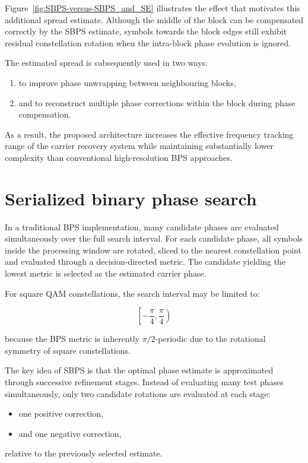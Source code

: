 Figure~\ref{fig:SBPS-versus-SBPS_and_SE} illustrates the effect that motivates this additional spread estimate. Although the middle of the block can be compensated correctly by the \ac{SBPS} estimate, symbols towards the block edges still exhibit residual constellation rotation when the intra-block phase evolution is ignored.

The estimated spread is subsequently used in two ways:
\begin{enumerate}
    \item to improve phase unwrapping between neighbouring blocks,
    \item and to reconstruct multiple phase corrections within the block during phase compensation.
\end{enumerate}

As a result, the proposed architecture increases the effective frequency tracking range of the carrier recovery system while maintaining substantially lower complexity than conventional high-resolution \ac{BPS} approaches.


\section{Serialized binary phase search}\label{sec:Serialized binary phase search}

In a traditional \ac{BPS} implementation, many candidate phases are evaluated simultaneously over the full search interval. For each candidate phase, all symbols inside the processing window are rotated, sliced to the nearest constellation point and evaluated through a decision-directed metric. The candidate yielding the lowest metric is selected as the estimated carrier phase.

For square \ac{QAM} constellations, the search interval may be limited to:

\[
\left[-\frac{\pi}{4},\frac{\pi}{4}\right)
\]

because the \ac{BPS} metric is inherently $\pi/2$-periodic due to the rotational symmetry of square constellations.

The key idea of \ac{SBPS} is that the optimal phase estimate is approximated through successive refinement stages. Instead of evaluating many test phases simultaneously, only two candidate rotations are evaluated at each stage:
\begin{itemize}
    \item one positive correction,
    \item and one negative correction,
\end{itemize}
relative to the previously selected estimate.

